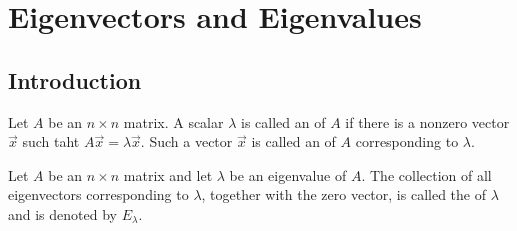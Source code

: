 \documentclass{article}
\begin{document}
\section{Eigenvectors and Eigenvalues}
\subsection{Introduction}
\begin{definition}
    Let $A$ be an $n\times n$ matrix. A scalar $\lambda$ is called an  of $A$ if there is a nonzero vector $\vec x$ such taht $A\vec x=\lambda\vec x$. Such a vector $\vec x$ is called an  of $A$ corresponding to $\lambda$.
\end{definition}
\begin{definition}
    Let $A$ be an $n\times n$ matrix and let $\lambda$ be an eigenvalue of $A$. The collection of all eigenvectors corresponding to $\lambda$, together with the zero vector, is called the  of $\lambda$ and is denoted by $E_\lambda$.
\end{definition}
\end{document}
